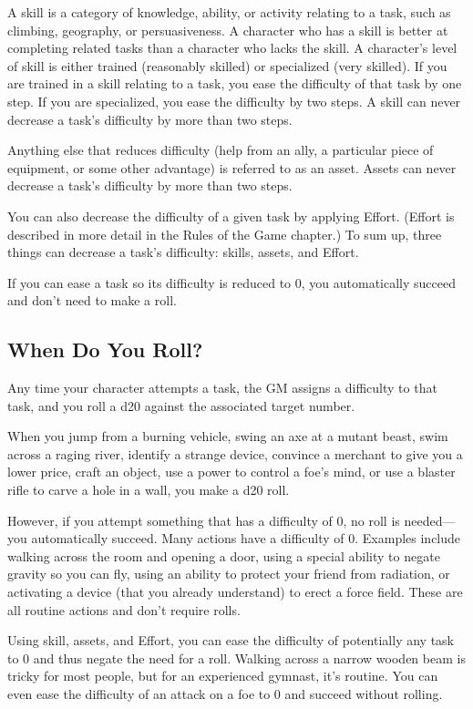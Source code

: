 \documentclass[a4paper,10pt]{book}
\begin{document}
\begin{multicols}{2}
A skill is a category of knowledge, ability, or activity relating to a task, such as climbing, geography, or persuasiveness. A character who has a skill is better at completing related tasks than a character who lacks the skill. A character’s level of skill is either trained (reasonably skilled) or specialized (very skilled).
If you are trained in a skill relating to a task, you ease the difficulty of that task by one step. If you are specialized, you ease the difficulty by two steps. A skill can never decrease a task’s difficulty by more than two steps.

Anything else that reduces difficulty (help from an ally, a particular piece of equipment, or some other advantage) is referred to as an asset. Assets can never decrease a task’s difficulty by more than two steps.

You can also decrease the difficulty of a given task by applying Effort. (Effort is described in more detail in the Rules of the Game chapter.) 
To sum up, three things can decrease a task’s difficulty: skills, assets, and Effort.

If you can ease a task so its difficulty is reduced to 0, you automatically succeed and don’t need to make a roll.

\subsection{When Do You Roll?}

Any time your character attempts a task, the GM assigns a difficulty to that task, and you roll a d20 against the associated target number.

When you jump from a burning vehicle, swing an axe at a mutant beast, swim across a raging river, identify a strange device, convince a merchant to give you a lower price, craft an object, use a power to control a foe’s mind, or use a blaster rifle to carve a hole in a wall, you make a d20 roll.

However, if you attempt something that has a difficulty of 0, no roll is needed—you automatically succeed. Many actions have a difficulty of 0. Examples include walking across the room and opening a door, using a special ability to negate gravity so you can fly, using an ability to protect your friend from radiation, or activating a device (that you already understand) to erect a force field. These are all routine actions and don’t require rolls.

Using skill, assets, and Effort, you can ease the difficulty of potentially any task to 0 and thus negate the need for a roll. Walking across a narrow wooden beam is tricky for most people, but for an experienced gymnast, it’s routine. You can even ease the difficulty of an attack on a foe to 0 and succeed without rolling.


\end{multicols}
\end{document}

